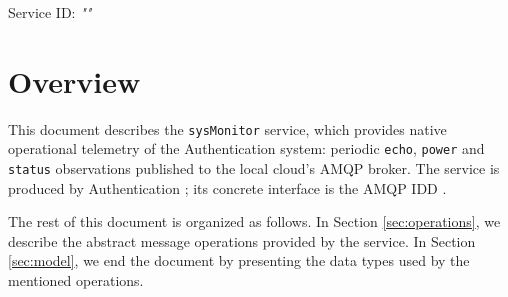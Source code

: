 \documentclass[a4paper]{arrowhead}
\begin{document}
\sloppy

\ArrowheadSetup

\begin{center}
  \vspace*{1cm}
  \huge{\arrowtitle}

  \vspace*{0.2cm}
  \LARGE{\arrowtype}
  \vspace*{1cm}

  \Large{Service ID: \textit{"\arrowid"}}

  \vspace*{\fill}


  \vspace*{1cm}
  \vspace*{\fill}

  \begin{abstract}
    This document describes the native \texttt{sysMonitor} service, version 1.0.0, produced by the Authentication core system of Arrowhead 5.2.2.
  \end{abstract}

  \vspace*{1cm}
\end{center}

\newpage

\tableofcontents
\newpage

\section{Overview}
\label{sec:overview}

This document describes the \texttt{sysMonitor} service, which provides native operational telemetry of the Authentication system: periodic \texttt{echo}, \texttt{power} and \texttt{status} observations published to the local cloud's AMQP broker.
The service is produced by Authentication \cite{auth-sysd}; its concrete interface is the AMQP IDD \cite{auth-sysMonitor-amqp-idd}.

The rest of this document is organized as follows.
In Section \ref{sec:operations}, we describe the abstract message operations provided by the service.
In Section \ref{sec:model}, we end the document by presenting the data types used by the mentioned operations.
\end{document}
